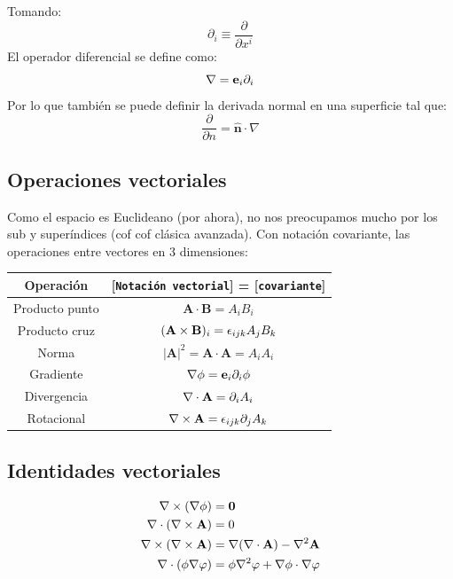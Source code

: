\documentclass[]{article}
\numberwithin{equation}{section}
\begin{document}
Tomando:
\begin{equation}
	\partial_i \equiv \dfrac{\partial}{\partial x^i}
\end{equation}
El operador diferencial se define como:
\begin{equation}
	\nabla = \mathbf{e}_i\partial_i
\end{equation}
Por lo que también se puede definir la derivada normal en una superficie tal que:
\begin{equation}
	\frac{\partial}{\partial n} = \hat{\mathbf{n}}\cdot\nabla
\end{equation}

\subsection{Operaciones vectoriales}	
Como el espacio es Euclideano (por ahora), no nos preocupamos mucho por los sub y superíndices (cof cof clásica avanzada). Con notación covariante, las operaciones entre vectores en 3 dimensiones:
\begin{table}[h]
	\centering
	\begin{tabular}{c|c}
		\textbf{Operación} & [\texttt{Notación vectorial}] = [\texttt{covariante}] \\
		\hline
		Producto punto & \(\mathbf{A}\cdot\mathbf{B} = A_iB_i\) \\
		\hline
		Producto cruz & \((\mathbf{A}\times\mathbf{B})_i = \epsilon_{ijk} A_jB_k\) \\
		\hline
		Norma & \(|\mathbf{A}|^2 = \mathbf{A}\cdot\mathbf{A} = A_iA_i\) \\
		\hline
		Gradiente & \(\nabla\phi = \mathbf{e}_i\partial_i\phi\) \\
		\hline
		Divergencia & \(\nabla\cdot\mathbf{A}=\partial_i A_i\) \\
		\hline
		Rotacional & \(\nabla\times\mathbf{A}=\epsilon_{ijk} \partial_j A_k\)
	\end{tabular}
\end{table}

\subsection{Identidades vectoriales}
\begin{align}
	\nabla\times(\nabla\phi) &= \mathbf{0}\label{idvec1}\\
	\nabla\cdot(\nabla\times\mathbf{A}) &= 0\label{idvec2}\\
	\nabla\times(\nabla\times\mathbf{A}) &= \nabla(\nabla\cdot\mathbf{A})-\nabla^2\mathbf{A}\label{idvec3}\\
	\nabla\cdot(\phi\nabla\varphi) &= \phi\nabla^2\varphi + \nabla\phi\cdot\nabla\varphi\label{idvec4}
\end{align}
\end{document}
